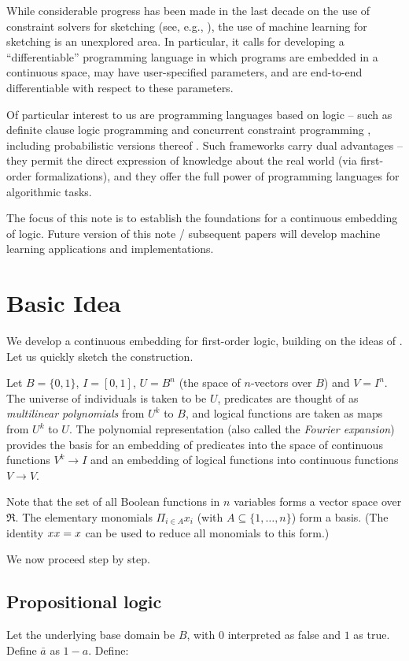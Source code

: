 \documentclass{article} %
\begin{document}
While considerable progress has been made in the last decade on the use of constraint solvers for sketching (see, e.g., \cite{armando}), the use of machine learning for sketching is an unexplored area. In particular, it calls for developing a ``differentiable'' programming language in which programs are embedded in a continuous space, may have user-specified parameters, and are end-to-end differentiable with respect to these parameters.  

Of particular interest to us are programming languages based on logic -- such as definite clause logic programming \cite{Kowalski76} and concurrent constraint programming \cite{CCP}, including probabilistic versions thereof \cite{muggleton:srl07,Gupta97b,cussens}. Such frameworks carry dual advantages -- they permit the direct expression of knowledge about the real world (via first-order formalizations), and they offer the full power of programming languages for algorithmic tasks. 

The focus of this note is to establish the foundations for a continuous embedding of logic. Future version of this note / subsequent papers will develop machine learning applications and implementations. 

\section{Basic Idea}
We develop a continuous embedding for first-order logic, building on the ideas of \cite{boolean-function}. Let us quickly sketch the construction.

Let $B=\{0,1\}$, $I=[0,1]$, $U=B^n$ (the space of $n$-vectors over $B$) and $V=I^n$. The universe of individuals is taken to be $U$, predicates are thought of as {\em multilinear polynomials} from $U^k$ to $B$, and logical functions are taken as maps from $U^k$ to $U$. The polynomial representation (also called the {\em Fourier expansion}) provides the basis for an embedding of  predicates into the space of continuous functions $V^k \rightarrow I$ and an embedding of logical functions into continuous functions $V\rightarrow V$.   

Note that the set of all Boolean functions in $n$ variables forms a vector space over $\Re$. The elementary monomials $\Pi_{i\in A} x_i$ (with $A \subseteq \{1,\ldots, n\}$) form a basis. (The identity $x x=x$ can be used to reduce all monomials to this form.) 

We now proceed step by step. 
\subsection{Propositional logic}\label{section:prop-logic}
Let the underlying base domain be $B$, with $0$ interpreted as false and $1$ as true. Define $\bar{a}$ as $1-a$. Define:
\end{document}
